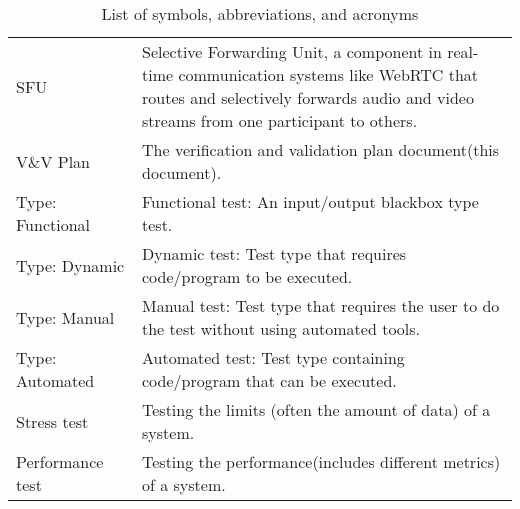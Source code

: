 \documentclass[12pt, titlepage]{article}
\begin{document}
\begin{table}[H]
\begin{tabular}{L{0.25\linewidth}L{0.8\linewidth}}
    SFU              & Selective Forwarding Unit, a component in real-time communication systems like WebRTC that routes and selectively forwards audio and video streams from one participant to others. \\
    V\&V Plan        & The verification and validation plan document(this document).                                                                                                                      \\
    Type: Functional & Functional test: An input/output blackbox type test.                                                                                                                               \\
    Type: Dynamic    & Dynamic test: Test type that requires code/program to be executed.                                                                                                                 \\
    Type: Manual     & Manual test: Test type that requires the user to do the test without using automated tools.                                                                                        \\
    Type: Automated  & Automated test: Test type containing code/program that can be executed.                                                                                                            \\
    Stress test      & Testing the limits (often the amount of data) of a system.                                                                                                                         \\
    Performance test & Testing the performance(includes different metrics) of a system.                                                                                                                   \\ \bottomrule
  \end{tabular}
  \caption{List of symbols, abbreviations, and acronyms}
  \label{tab:abbrv}
\end{table}
\end{document}
